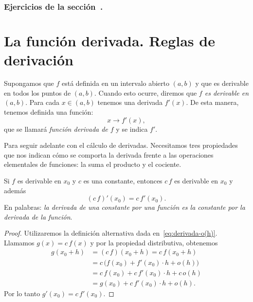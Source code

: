 \subsubsection*{Ejercicios de la sección~.}

\begin{enumerate}

\end{enumerate}


\section{La función derivada. Reglas de derivación}

Supongamos que $f$ está definida en un intervalo abierto $(a,b)$ y que es derivable en todos los puntos de $(a,b)$.
Cuando esto ocurre, diremos que \emph{$f$ es derivable en $(a,b)$}.
Para cada $x\in(a,b)$ tenemos una derivada $f'(x)$. De esta manera, tenemos definida una función:
\[
x \to f'(x),
\]
que se llamará \emph{función derivada de $f$} y se indica $f'$.


Para seguir adelante con el cálculo de derivadas. Necesitamos tres propiedades que nos indican cómo se comporta la derivada frente a las operaciones elementales de funciones: la suma el producto y el cociente.

\begin{proposition}
    Si $f$ es derivable en $x_0$ y $c$ es una constante, entonces $c\, f$ es derivable en $x_0$ y además
    \[
    (c\, f)'(x_0) = c \, f'(x_0).
    \]
    En palabras: \emph{la derivada de una constante por una función es la constante por la derivada de la función}.
\end{proposition}

\begin{proof}
Utilizaremos la definición alternativa dada en~\eqref{eq:derivada-o(h)}.
Llamamos $g(x)=c\, f(x)$ y por la propiedad distributiva, obtenemos
\begin{align*}
    g(x_0+h) &= (c \, f)(x_0+h) = c \, f(x_0+h) 
    \\
    &= c\, \big( f(x_0) + f'(x_0)\cdot h + o(h) \big) 
    \\
    &=  c\, f(x_0) + c\, f'(x_0)\cdot h + c\, o(h)
    \\
    &=  g(x_0) + c\, f'(x_0)\cdot h +  o(h).
\end{align*}    
Por lo tanto $g'(x_0) = c\, f'(x_0)$.
\end{proof}

